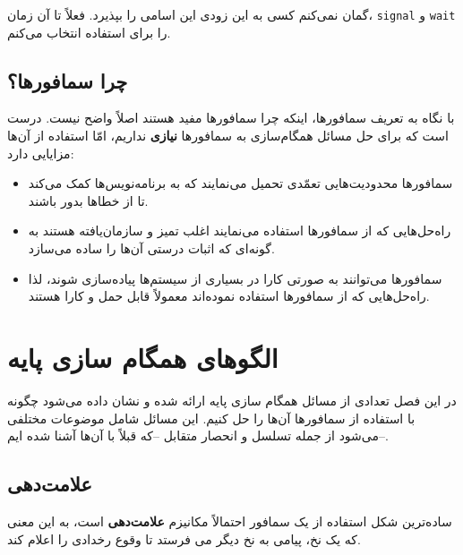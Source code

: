 \documentclass{book}
\newcommand{\clearemptydoublepage}{\newpage\cleardoublepage}
\begin{document}
    گمان نمی‌کنم کسی به این زود‌ی این اسامی را بپذیرد. فعلاً تا آن زمان، \texttt{signal} و \texttt{wait}
     را برای استفاده انتخاب می‌کنم.
    

\section{چرا سمافورها؟}

    با نگاه به تعریف سمافورها، اینکه چرا سمافورها مفید هستند اصلاً واضح نیست. 
    درست است که برای حل مسائل همگام‌سازی به سمافورها \textbf{نیازی} نداریم، امّا استفاده از آن‌ها مزایایی دارد:

\begin{itemize}

\item 
    سمافورها محدودیت‌هایی تعمّدی تحمیل می‌نمایند که به برنامه‌نویس‌ها کمک می‌کند تا از خطاها بدور باشند. 

\item 
    راه‌حل‌هایی که از سمافورها استفاده می‌نمایند اغلب تمیز و سازمان‌یافته هستند به گونه‌ای که اثبات درستی آن‌ها را ساده می‌سازد. 

\item 
    سمافورها می‌توانند به صورتی کارا در بسیاری از سیستم‌ها پیاده‌سازی شوند، لذا راه‌حل‌هایی که از سمافورها استفاده نموده‌اند معمولاً قابل حمل 
    و کارا هستند. 
\end{itemize}

\clearemptydoublepage

\chapter{الگوهای همگام سازی پایه}

در این فصل تعدادی از مسائل همگام سازی پایه ارائه شده و نشان داده می‌شود چگونه با استفاده از سمافورها آن‌ها را حل کنیم. این مسائل شامل موضوعات مختلفی می‌شود از جمله تسلسل و انحصار متقابل --که قبلاً با آن‌ها آشنا شده ایم--.

\section{علامت‌دهی}

ساده‌ترین شکل استفاده از یک سمافور احتمالاً مکانیزم \textbf{علامت‌دهی}  است، 
به این معنی که یک نخ، پیامی به نخ دیگر می فرستد تا وقوع رخدادی را اعلام کند.
\end{document}

